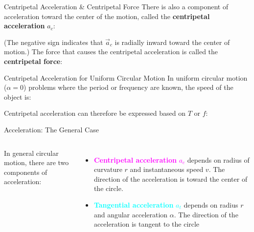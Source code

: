 \documentclass[12pt,compress,aspectratio=169]{beamer}
\begin{document}
\begin{frame}{Centripetal Acceleration \& Centripetal Force}
  There is also a component of acceleration toward the center of the motion,
  called the \textbf{centripetal acceleration} $a_c$:


  (The negative sign indicates that $\vec a_c$ is radially inward toward the
  center of motion.) The force that causes the centripetal acceleration is
  called the \textbf{centripetal force}:

\end{frame}



\begin{frame}{Centripetal Acceleration for Uniform Circular Motion}
  In uniform circular motion ($\alpha=0$) problems where the period or
  frequency are known, the speed of the object is:


  Centripetal acceleration can therefore be expressed based on $T$ or $f$:

\end{frame}



\begin{frame}{Acceleration: The General Case}
  \begin{columns}
    
    In general circular motion, there are two components of acceleration:
    \begin{itemize}
    \item\textcolor{magenta}{\textbf{Centripetal acceleration} $a_c$} depends on
      radius of curvature $r$ and instantaneous speed $v$. The direction of
      the acceleration is toward the center of the circle.
    \item \textcolor{cyan}{\textbf{Tangential acceleration} $a_t$}
      depends on radius $r$  and angular acceleration $\alpha$. The direction
      of the acceleration is tangent to the circle
    \end{itemize}
  \end{columns}
\end{frame}
\end{document}
